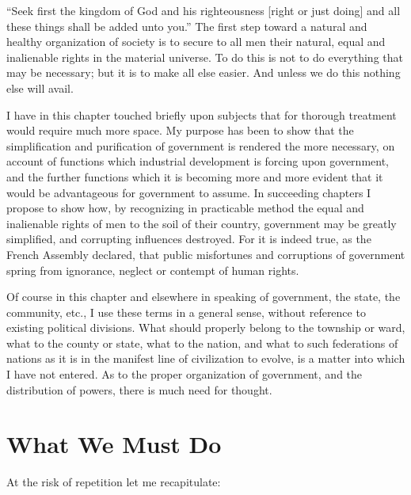 \documentclass{book}
\begin{document}
“Seek first the kingdom of God and his righteousness {[}right or just doing{]} and all these things shall be added unto you.” The first step toward a natural and healthy organization of society is to secure to all men their natural, equal and inalienable rights in the material universe. To do this is not to do everything that may be necessary; but it is to make all else easier. And unless we do this nothing else will avail.

I have in this chapter touched briefly upon subjects that for thorough treatment would require much more space. My purpose has been to show that the simplification and purification of government is rendered the more necessary, on account of functions which industrial development is forcing upon government, and the further functions which it is becoming more and more evident that it would be advantageous for government to assume. In succeeding chapters I propose to show how, by recognizing in practicable method the equal and inalienable rights of men to the soil of their country, government may be greatly simplified, and corrupting influences destroyed. For it is indeed true, as the French Assembly declared, that public misfortunes and corruptions of government spring from ignorance, neglect or contempt of human rights.

Of course in this chapter and elsewhere in speaking of government, the state, the community, etc., I use these terms in a general sense, without reference to existing political divisions. What should properly belong to the township or ward, what to the county or state, what to the nation, and what to such federations of nations as it is in the manifest line of civilization to evolve, is a matter into which I have not entered. As to the proper organization of government, and the distribution of powers, there is much need for thought.

\chapter{What We Must Do}
\label{chapter-18}
At the risk of repetition let me recapitulate:
\end{document}
